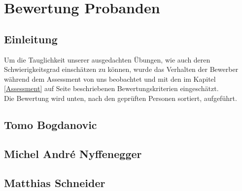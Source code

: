 \chapter{Bewertung Probanden}

\section{Einleitung}

Um die Tauglichkeit unserer ausgedachten Übungen, wie auch deren Schwierigkeitsgrad einschätzen zu können, wurde das Verhalten der Bewerber während dem  Assessment von uns beobachtet und mit den im Kapitel \ref{Assessment} auf Seite \pageref{Assessment} beschriebenen Bewertungskriterien eingeschätzt.\\
Die Bewertung wird unten, nach den geprüften Personen sortiert, aufgeführt.


\section{Tomo Bogdanovic}

\section{Michel André Nyffenegger}

\section{Matthias Schneider}

